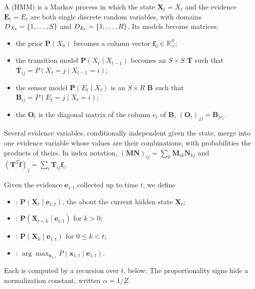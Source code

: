 \documentclass[11pt, a4paper]{exam}
\begin{document}
\begin{recap}
    A  (HMM) is a Markov process in which the state $\mathbf{X}_t = X_t$ and the evidence $\mathbf{E}_t = E_t$ are both single discrete random variables, with domains $D_{X_t} = \{1, \ldots, S\}$ and $D_{E_t} = \{1, \ldots, R\}$. Its models become matrices:
    \begin{itemize}
        \item the prior $\mathbf{P}(X_0)$ becomes a column vector $\mathbf{f}_0 \in \mathbb{R}_+^S$;
        \item the transition model $\mathbf{P}(X_t \mid X_{t-1})$ becomes an $S \times S$  $\mathbf{T}$ such that $\mathbf{T}_{ij} = P(X_t = j \mid X_{t-1} = i)$;
        \item the sensor model $\mathbf{P}(E_t \mid X_t)$ is an $S \times R$  $\mathbf{B}$ such that $\mathbf{B}_{ij} = P(E_t = j \mid X_t = i)$;
        \item the  $\mathbf{O}_t$ is the diagonal matrix of the column $e_t$ of $\mathbf{B}$, $(\mathbf{O}_t)_{jj} = \mathbf{B}_{j e_t}$.
    \end{itemize}
    Several evidence variables, conditionally independent given the state, merge into one evidence variable whose values are their combinations, with probabilities the products of theirs. In index notation, $(\mathbf{M} \mathbf{N})_{ij} = \sum_k \mathbf{M}_{ik} \mathbf{N}_{kj}$ and $(\mathbf{T}^T \mathbf{f})_j = \sum_i \mathbf{T}_{ij} \mathbf{f}_i$.

    Given the evidence $\mathbf{e}_{1:t}$ collected up to time $t$, we define
    \begin{itemize}
        \item {}: $\mathbf{P}(\mathbf{X}_t \mid \mathbf{e}_{1:t})$, the  about the current hidden state $\mathbf{X}_t$;
        \item {}: $\mathbf{P}(\mathbf{X}_{t+k} \mid \mathbf{e}_{1:t})$ for $k > 0$;
        \item {}: $\mathbf{P}(\mathbf{X}_k \mid \mathbf{e}_{1:t})$ for $0 \leq k < t$;
        \item {}: $\arg \max_{\mathbf{x}_{1:t}} P(\mathbf{x}_{1:t} \mid \mathbf{e}_{1:t})$.
    \end{itemize}
    Each is computed by a recursion over $t$, below. The proportionality signs hide a normalization constant, written $\alpha = 1/Z$.


\end{recap}
\end{document}
